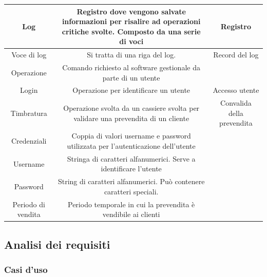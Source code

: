 \documentclass[a4paper]{article}
\begin{document}
\begin{table}[ht!]
\begin{center}
\begin{tabulary}{1\textwidth}{c|C|C}
		\hline
		Log & Registro dove vengono salvate informazioni per risalire ad operazioni critiche svolte. Composto da una serie di voci & Registro \\
		\hline
		Voce di log & Si tratta di una riga del log. & Record del log\\
		\hline
		Operazione & Comando richiesto al software gestionale da parte di un utente & \\
		\hline
		Login & Operazione per identificare un utente & Accesso utente \\
		\hline
		Timbratura & Operazione svolta da un cassiere svolta per validare una prevendita di un cliente & Convalida della prevendita \\
		\hline
		Credenziali & Coppia di valori username e password utilizzata per l'autenticazione dell'utente & \\
		\hline
		Username & Stringa di caratteri alfanumerici. Serve a identificare l'utente & \\
		\hline
		Password & String di caratteri alfanumerici. Può contenere caratteri speciali. & \\
		\hline
		Periodo di vendita & Periodo temporale in cui la prevendita è vendibile ai clienti & \\
		\hline
    \end{tabulary}
  \end{center}
\end{table}

\newpage

\subsection{Analisi dei requisiti}
\subsubsection{Casi d'uso}
\end{document}
